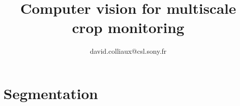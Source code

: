 \documentclass[notes,xcolor={x11names,dvipsnames,svgnames},compress]{beamer}
\renewcommand{\(}{\begin{columns}}
\renewcommand{\)}{\end{columns}}
\newcommand{\<}[1]{\begin{column}{#1}}
\renewcommand{\>}{\end{column}}
\begin{document}

\begin{frame}

\title{Computer vision for multiscale crop monitoring}

\author{david.colliaux@csl.sony.fr}
       
\titlepage

\vspace{.5cm}

\end{frame}

\usebackgroundtemplate{}

 

\section{Segmentation}



% 

% 
\end{document}
